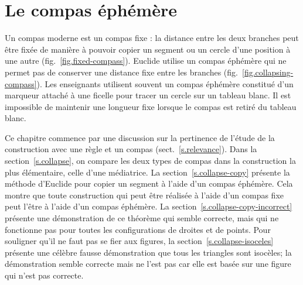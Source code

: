 

\chapter{Le compas éphémère}\label{c.collapse}



Un compas moderne est un compas fixe : la distance entre les deux branches peut être fixée de manière à pouvoir copier un segment  ou un cercle d'une position à une autre (fig.~\ref{fig.fixed-compass}). Euclide utilise un \og compas éphémère\fg{} qui ne permet pas de conserver  une distance fixe entre les branches  (fig.~\ref{fig.collapsing-compass}). Les enseignants utilisent souvent un compas éphémère constitué d'un marqueur attaché à une ficelle pour tracer un cercle sur un tableau blanc. Il est impossible de maintenir une longueur fixe lorsque le compas est retiré du tableau blanc. 

Ce chapitre commence par une discussion sur la pertinence de l'étude de la construction avec une règle et un compas (sect.~\ref{s.relevance}).
Dans la section~\ref{s.collapse}, on  compare les deux types de compas dans la construction la plus élémentaire, celle d'une médiatrice. La section~\ref{s.collapse-copy} présente la méthode d'Euclide pour copier un segment  à l'aide d'un compas éphémère. Cela montre que toute construction qui peut être réalisée à l'aide d'un compas fixe peut l'être à l'aide d'un compas éphémère. La section~\ref{s.collapse-copy-incorrect} présente  une démonstration de ce théorème qui semble correcte, mais qui ne fonctionne pas pour toutes les configurations de droites et de points. Pour souligner qu'il ne faut pas se fier aux figures, la section~\ref{s.collapse-isoceles} présente une célèbre fausse démonstration  que tous les triangles sont isocèles; la démonstration  semble correcte mais ne l'est pas car elle est basée sur une figure qui n'est pas correcte.


